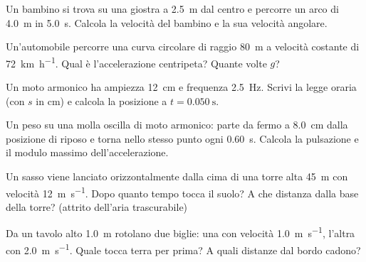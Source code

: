 \begin{esercizio}
Un bambino si trova su una giostra a \SI{2,5}{\metre} dal centro e percorre un arco di \SI{4,0}{\metre} in \SI{5,0}{\second}. Calcola la velocità del bambino e la sua velocità angolare.\\
\end{esercizio}

\begin{esercizio}
Un'automobile percorre una curva circolare di raggio \SI{80}{\metre} a velocità costante di \SI{72}{\kilo\metre\per\hour}. Qual è l'accelerazione centripeta? Quante volte $g$?\\
\end{esercizio}

\begin{esercizio}
Un moto armonico ha ampiezza \SI{12}{\centi\metre} e frequenza \SI{2,5}{\hertz}. Scrivi la legge oraria (con $s$ in cm) e calcola la posizione a $t = \SI{0,050}{\second}$.\\
\end{esercizio}

\begin{esercizio}
Un peso su una molla oscilla di moto armonico: parte da fermo a \SI{8,0}{\centi\metre} dalla posizione di riposo e torna nello stesso punto ogni \SI{0,60}{\second}. Calcola la pulsazione e il modulo massimo dell'accelerazione.\\
\end{esercizio}

\begin{esercizio}
Un sasso viene lanciato orizzontalmente dalla cima di una torre alta \SI{45}{\metre} con velocità \SI{12}{\metre\per\second}. Dopo quanto tempo tocca il suolo? A che distanza dalla base della torre? (attrito dell'aria trascurabile)\\
\end{esercizio}

\begin{esercizio}
Da un tavolo alto \SI{1,0}{\metre} rotolano due biglie: una con velocità \SI{1,0}{\metre\per\second}, l'altra con \SI{2,0}{\metre\per\second}. Quale tocca terra per prima? A quali distanze dal bordo cadono?\\
\end{esercizio}

